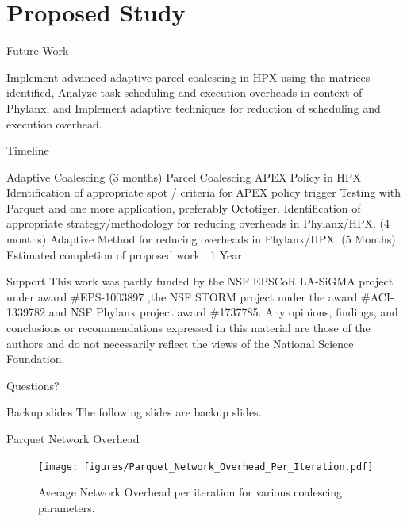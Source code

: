 \documentclass[10pt]{beamer}
\begin{document}
\section{Proposed Study}

\begin{frame}{Future Work}
\begin{outline}
	\1 Implement advanced adaptive parcel coalescing in HPX using the matrices identified,
	\1 Analyze task scheduling and execution overheads in context of Phylanx, and
	\1 Implement adaptive techniques for reduction of scheduling and execution overhead.
\end{outline}
\end{frame}

\begin{frame}{Timeline}
\begin{outline}
	\1 Adaptive Coalescing (3 months)
		\2 Parcel Coalescing APEX Policy in HPX 
		\2 Identification of appropriate spot / criteria for APEX policy trigger
		\2 Testing with Parquet and one more application, preferably Octotiger.
	\1 Identification of appropriate strategy/methodology for reducing overheads in Phylanx/HPX. (4 months)
	\1 Adaptive Method for reducing overheads in Phylanx/HPX. (5 Months)
	\1 Estimated completion of proposed work : 1 Year
\end{outline}
\end{frame}

\begin{frame}{Support}
 This work was partly funded by the NSF EPSCoR LA-SiGMA project under award \#EPS-1003897 ,the NSF STORM project under the award \#ACI-1339782 and NSF Phylanx project award \#1737785. Any opinions, findings, and conclusions or recommendations expressed in this material are those of the authors and do not necessarily reflect the views of the National Science Foundation.
\end{frame}

\begin{frame}[standout]
  Questions?
\end{frame}

\appendix

\begin{frame}[fragile]{Backup slides}
The following slides are backup slides. 
\end{frame}

\begin{frame}{Parquet Network Overhead}
\begin{figure}
	\centering
	\texttt{[image: figures/Parquet\_Network\_Overhead\_Per\_Iteration.pdf]}
	\caption{{Average Network Overhead per iteration for various coalescing parameters.}}
	\label{figureTime-Parq}
\end{figure}
\end{frame}
\end{document}

